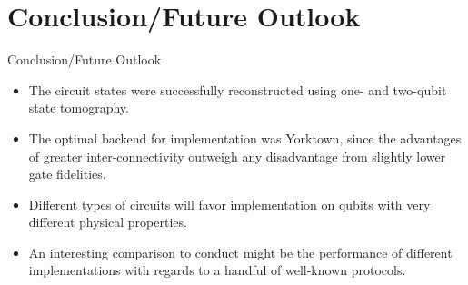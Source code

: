 \section{Conclusion/Future Outlook}
\begin{frame}{Conclusion/Future Outlook}
\begin{itemize}
	\item The circuit states were successfully reconstructed using one- and
	two-qubit state tomography.
	\item The optimal backend for implementation was Yorktown, since the advantages of greater inter-connectivity outweigh any disadvantage from slightly lower gate fidelities.
	\item Different types of circuits will favor implementation on qubits with very different physical properties.
	\item An
	interesting comparison to conduct might be the performance of different
	implementations with regards to a handful of well-known protocols.
\end{itemize}
\end{frame}
